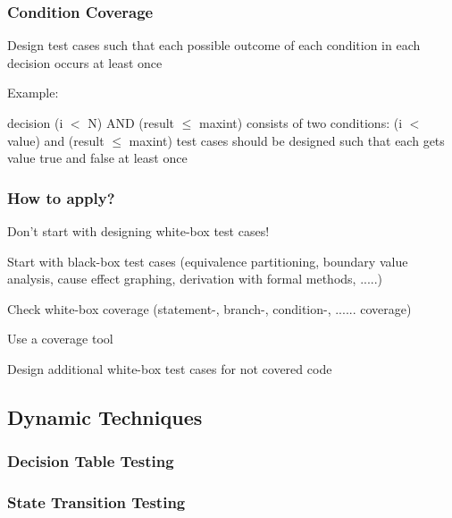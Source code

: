 
\subsubsection{Condition Coverage}

\begin{itemize*}
	\item Design test cases such that each possible outcome of each condition in each decision occurs at least once
	\item Example:
	\begin{itemize*}
		\item decision (i $<$ N) AND (result $\leq$ maxint) consists of two conditions: (i $<$ value) and (result $\leq$ maxint) test cases should be designed such that each gets value
		true and false at least once
	\end{itemize*}
\end{itemize*}


\subsubsection{How to apply?}

\begin{itemize*}
	\item Don't start with designing white-box test cases!
	\item Start with black-box test cases
	(equivalence partitioning, boundary value analysis, cause effect graphing, derivation with formal methods, .....)
	\item Check white-box coverage (statement-, branch-, condition-, ...... coverage)
	\item Use a coverage tool
	\item Design additional white-box test cases for not covered code
\end{itemize*}

\subsection{Dynamic Techniques}

\subsubsection{Decision Table Testing}

\subsubsection{State Transition Testing}

